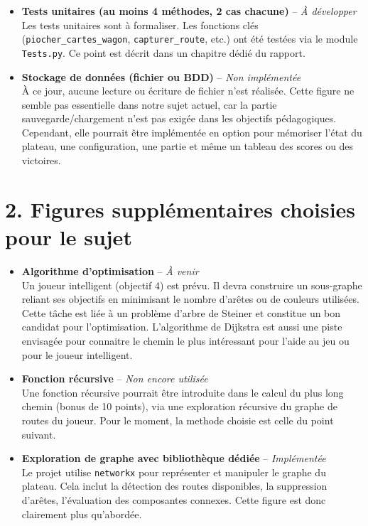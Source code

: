 \documentclass[a4paper,12pt]{report}
\begin{document}
\begin{itemize}
    \item \textbf{Tests unitaires (au moins 4 méthodes, 2 cas chacune)} – \textit{À développer} \\
    Les tests unitaires sont à formaliser.
    Les fonctions clés (\texttt{piocher\_cartes\_wagon}, \texttt{capturer\_route}, etc.) ont été testées via le module
    \texttt{Tests.py}. Ce point est décrit dans un chapitre dédié du rapport.

    \item \textbf{Stockage de données (fichier ou BDD)} – \textit{Non implémentée} \\
    À ce jour, aucune lecture ou écriture de fichier n’est réalisée.
    Cette figure ne semble pas essentielle dans notre sujet actuel, car la partie sauvegarde/chargement n’est pas exigée
    dans les objectifs pédagogiques. Cependant, elle pourrait être implémentée en option pour mémoriser l’état du
    plateau, une configuration, une partie et même un tableau des scores ou des victoires.

\end{itemize}

\section*{2. Figures supplémentaires choisies pour le sujet}

\begin{itemize}
    \item \textbf{Algorithme d’optimisation} – \textit{À venir} \\
    Un joueur intelligent (objectif 4) est prévu.
    Il devra construire un sous-graphe reliant ses objectifs en minimisant le nombre d’arêtes ou de couleurs utilisées.
    Cette tâche est liée à un problème d’arbre de Steiner et constitue un bon candidat pour l’optimisation.
    L'algorithme de Dijkstra est aussi une piste envisagée pour connaitre le chemin le plus intéressant pour l'aide au
    jeu ou pour le joueur intelligent.

    \item \textbf{Fonction récursive} – \textit{Non encore utilisée} \\
    Une fonction récursive pourrait être introduite dans le calcul du plus long chemin (bonus de 10 points),
    via une exploration récursive du graphe de routes du joueur.
    Pour le moment, la methode choisie est celle du point suivant.

    \item \textbf{Exploration de graphe avec bibliothèque dédiée} – \textit{Implémentée} \\
    Le projet utilise \texttt{networkx} pour représenter et manipuler le graphe du plateau.
    Cela inclut la détection des routes disponibles, la suppression d’arêtes, l’évaluation des composantes connexes.
    Cette figure est donc clairement plus qu'abordée.

\end{itemize}
\end{document}
